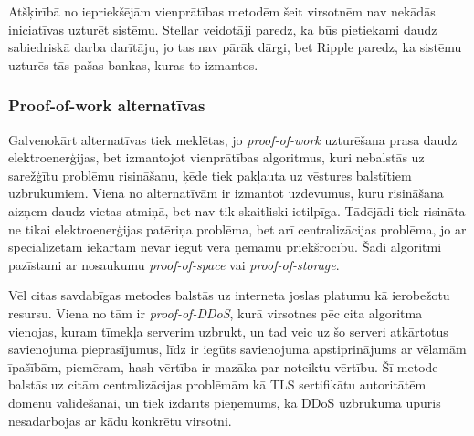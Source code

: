 Atšķirībā no iepriekšējām vienprātības metodēm šeit virsotnēm nav nekādās iniciatīvas uzturēt sistēmu.
Stellar veidotāji paredz, ka būs pietiekami daudz sabiedriskā darba darītāju, jo tas nav pārāk dārgi, bet Ripple paredz, ka sistēmu uzturēs tās pašas bankas, kuras to izmantos.

\subsubsection{Proof-of-work alternatīvas}
Galvenokārt alternatīvas tiek meklētas, jo \textit{proof-of-work} uzturēšana prasa daudz elektroenerģijas, bet izmantojot vienprātības algoritmus, kuri nebalstās uz sarežģītu problēmu risināšanu, ķēde tiek pakļauta uz vēstures balstītiem uzbrukumiem. Viena no alternatīvām ir izmantot uzdevumus, kuru risināšana aizņem daudz vietas atmiņā, bet nav tik skaitliski ietilpīga.\cite{dziembowski15} Tādējādi tiek risināta ne tikai elektroenerģijas patēriņa problēma, bet arī centralizācijas problēma, jo ar specializētām iekārtām nevar iegūt vērā ņemamu priekšrocību. Šādi algoritmi pazīstami ar nosaukumu \textit{proof-of-space} vai \textit{proof-of-storage}.

Vēl citas savdabīgas metodes balstās uz interneta joslas platumu kā ierobežotu resursu. Viena no tām ir \textit{proof-of-DDoS}, kurā virsotnes pēc cita algoritma vienojas, kuram tīmekļa serverim uzbrukt, un tad veic uz šo serveri atkārtotus savienojuma pieprasījumus, līdz ir iegūts savienojuma apstiprinājums ar vēlamām īpašībām, piemēram, hash vērtība ir mazāka par noteiktu vērtību. Šī metode balstās uz citām centralizācijas problēmām kā TLS sertifikātu autoritātēm domēnu validēšanai, un tiek izdarīts pieņēmums, ka DDoS uzbrukuma upuris nesadarbojas ar kādu konkrētu virsotni.\cite{wustrow16}

